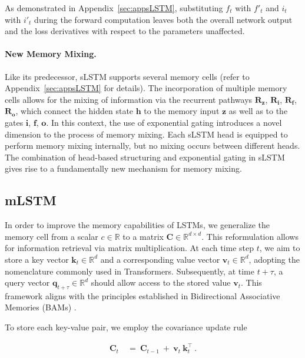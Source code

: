As demonstrated in Appendix~\ref{sec:appsLSTM}, substituting $f_t$ with $f'_t$ and $i_t$ with $i'_t$ during the forward computation leaves both the overall network output and the loss derivatives with respect to the parameters unaffected.

\paragraph{New Memory Mixing.} Like its predecessor, sLSTM supports several memory cells (refer to Appendix~\ref{sec:appsLSTM} for details). The incorporation of multiple memory cells allows for the mixing of information via the recurrent pathways $\mathbf{R}_{\mathbf{z}}$, $\mathbf{R}_{\mathbf{i}}$, $\mathbf{R}_{\mathbf{f}}$, $\mathbf{R}_{\mathbf{o}}$, which connect the hidden state $\mathbf{h}$ to the memory input $\mathbf{z}$ as well as to the gates $\mathbf{i}$, $\mathbf{f}$, $\mathbf{o}$. In this context, the use of exponential gating introduces a novel dimension to the process of memory mixing. Each sLSTM head is equipped to perform memory mixing internally, but no mixing occurs between different heads. The combination of head-based structuring and exponential gating in sLSTM gives rise to a fundamentally new mechanism for memory mixing.

\subsection{mLSTM}
\label{sec:mLSTM}

In order to improve the memory capabilities of LSTMs, we generalize the memory cell from a scalar $c \in \mathbb{R}$ to a matrix $\mathbf{C} \in \mathbb{R}^{d \times d}$. This reformulation allows for information retrieval via matrix multiplication. At each time step $t$, we aim to store a key vector $\mathbf{k}_t \in \mathbb{R}^d$ and a corresponding value vector $\mathbf{v}_t \in \mathbb{R}^d$, adopting the nomenclature commonly used in Transformers. Subsequently, at time $t + \tau$, a query vector $\mathbf{q}_{t+\tau} \in \mathbb{R}^d$ should allow access to the stored value $\mathbf{v}_t$. This framework aligns with the principles established in Bidirectional Associative Memories (BAMs) \citep{Kohonen:72,Anderson:72,Nakano:72,Anderson:77}.

To store each key-value pair, we employ the covariance update rule~\citep{Sejnowski:77,Dayan:91}

\begin{align}
\mathbf{C}_t \ &= \ \mathbf{C}_{t-1} \ + \ \mathbf{v}_{t} \ \mathbf{k}_t^\top \ .
\end{align}


